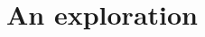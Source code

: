 \documentclass[\ifafour a4paper,12pt,\else a5paper,10pt,\fi%
onecolumn,oneside,article,%
british%
]{memoir}
\theoremstyle{remark}
\theoremstyle{innote}
\renewcommand*{\|}[1][]{\nonscript\,#1\vert\nonscript\;\mathopen{}}
\begin{document}

\section{An exploration}
\label{sec:soup}




\end{document}
